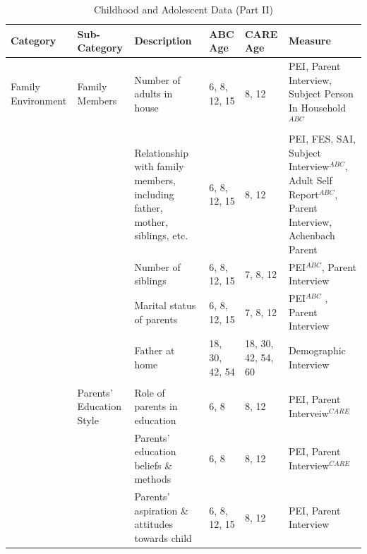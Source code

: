 \documentclass[static]{JJH-Beamer}
\begin{document}
\begin{frame}
 \addtocounter{framenumber}{-1}

\begin{table}[H]
\caption{Childhood and Adolescent Data (Part II)} \label{tab:youthvars_2}
\begin{center}
\begin{tiny}
\begin{tabular}{L{1.2cm} C{1.4cm} C{2.5cm} C{.9cm} C{.8cm} C{2.9cm}}
\toprule
\textbf{Category}	&	\textbf{Sub-Category}	&	\textbf{Description}	&	\textbf{ABC Age}  	&  \textbf{CARE Age}  & 	\textbf{Measure}	\\ \midrule
Family Environment	&	Family Members	&	Number of adults in house	&	6, 8, 12, 15	&	8, 12	&	PEI, Parent Interview, Subject Person In Household$^{ABC}$		\\
	&		&	Relationship with family members, including father, mother, siblings, etc.	&	6, 8, 12, 15	&	8, 12	&	PEI, FES, SAI, Subject Interview$^{ABC}$, Adult Self Report$^{ABC}$, Parent Interview, Achenbach Parent	\\
	&		&	Number of siblings	&	6, 8, 12, 15	&	7, 8, 12	&	PEI$^{ABC}$, Parent Interview	\\
	&		&	Marital status of parents	&	6, 8, 12, 15	&	7, 8, 12	&	PEI$^{ABC}$	, Parent Interview	\\
		&		& Father at home & 18, 30, 42, 54  & 18, 30, 42, 54, 60 & Demographic Interview \\
	&	\\
	&	Parents' Education Style	&	Role of parents in education	&	6, 8	&	8, 12	&	PEI, Parent Interveiw$^{CARE}$	\\
	&		&	Parents' education beliefs \& methods&	6, 8	&	8, 12 	&	PEI, Parent Interview$^{CARE}$		\\
	&		&	Parents' aspiration \& attitudes towards child	&	6, 8, 12, 15	&	8, 12	&	PEI, Parent Interview	\\
\bottomrule
\end{tabular}
\end{tiny}
\end{center}
\end{table}

\end{frame}
\end{document}
